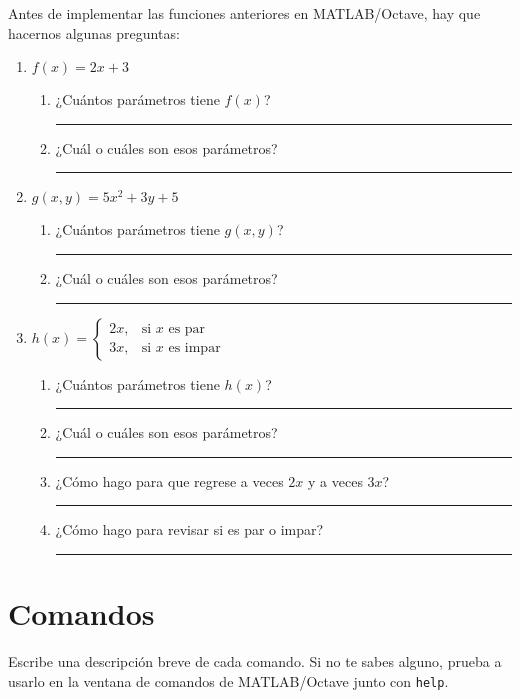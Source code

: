 \documentclass[spanish, 10pt]{article}
\newcommand{\shortresponserule}{{\large\rule{5 cm}{0.3mm}}}
\newcommand{\matlab}[1]{\lstinline[style=Matlab-pyglike]!#1!}
\begin{document}
Antes de implementar las funciones anteriores en MATLAB/Octave, hay que hacernos algunas preguntas:

\begin{enumerate}
	\item $f(x) = 2x + 3$
	\begin{enumerate}
        \item ¿Cuántos parámetros tiene $f(x)$? \hfill \shortresponserule
        \item ¿Cuál o cuáles son esos parámetros? \hfill \shortresponserule
    \end{enumerate}
	\item $g(x,y) = 5x^2 + 3y + 5$
	\begin{enumerate}
        \item ¿Cuántos parámetros tiene $g(x,y)$? \hfill \shortresponserule
        \item ¿Cuál o cuáles son esos parámetros? \hfill \shortresponserule
    \end{enumerate}
	\item $h(x) =
    \begin{cases}
        2x, & \text{si } x \text{ es par} \\
        3x, & \text{si } x \text{ es impar}
    \end{cases}$
    \begin{enumerate}
        \item ¿Cuántos parámetros tiene $h(x)$? \hfill \shortresponserule
        \item ¿Cuál o cuáles son esos parámetros? \hfill \shortresponserule
        \item ¿Cómo hago para que regrese a veces $2x$ y a veces $3x$? \hfill \shortresponserule
        \item ¿Cómo hago para revisar si es par o impar? \hfill \shortresponserule
    \end{enumerate}
\end{enumerate}

\section{Comandos}

Escribe una descripción breve de cada comando. Si no te sabes alguno, prueba a usarlo en la ventana de comandos de MATLAB/Octave junto con \matlab{help}.

\vspace{3ex}
\end{document}
